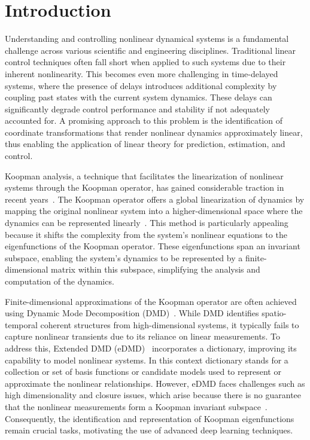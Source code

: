 \documentclass[conference]{IEEEtran}
\begin{document}
\section{Introduction}
Understanding and controlling nonlinear dynamical systems is a fundamental challenge across various scientific and engineering disciplines. Traditional linear control techniques often fall short when applied to such systems due to their inherent nonlinearity. This becomes even more challenging in time-delayed systems, where the presence of delays introduces additional complexity by coupling past states with the current system dynamics. These delays can significantly degrade control performance and stability if not adequately accounted for. A promising approach to this problem is the identification of coordinate transformations that render nonlinear dynamics approximately linear, thus enabling the application of linear theory for prediction, estimation, and control.

Koopman analysis, a technique that facilitates the linearization of nonlinear systems through the Koopman operator, has gained considerable traction in recent years~\cite{Wilson2023siamkoopman, Mauroy2016cdc}. The Koopman operator offers a global linearization of dynamics by mapping the original nonlinear system into a higher-dimensional space where the dynamics can be represented linearly~\cite{Mezic2004101, Mezić2005}.
This method is particularly appealing because it shifts the complexity from the system's nonlinear equations to the eigenfunctions of the Koopman operator. These eigenfunctions span an invariant subspace, enabling the system's dynamics to be represented by a finite-dimensional matrix within this subspace, simplifying the analysis and computation of the dynamics.

Finite-dimensional approximations of the Koopman operator are often achieved using Dynamic Mode Decomposition (DMD)~\cite{schmid2010dynamic}. While DMD identifies spatio-temporal coherent structures from high-dimensional systems, it typically fails to capture nonlinear transients due to its reliance on linear measurements. To address this, Extended DMD (eDMD)~\cite{williams2015data} incorporates a dictionary, improving its capability to model nonlinear systems. In this context dictionary stands for a collection or set of basis functions or candidate models used to represent or approximate the nonlinear relationships. However, eDMD faces challenges such as high dimensionality and closure issues, which arise because there is no guarantee that the nonlinear measurements form a Koopman invariant subspace~\cite{Lusch2018}. Consequently, the identification and representation of Koopman eigenfunctions remain crucial tasks, motivating the use of advanced deep learning techniques.
\end{document}
